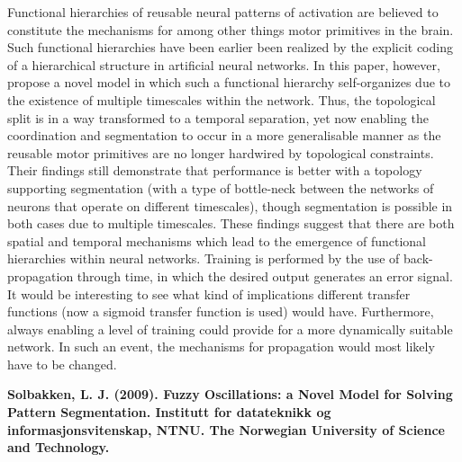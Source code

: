 Functional hierarchies of reusable neural patterns of activation are believed to constitute the mechanisms for among other things motor primitives in the brain. Such functional hierarchies have been earlier been realized by the explicit coding of a hierarchical structure in artificial neural networks. In this paper, however, \cite{Yamashita2008} propose a novel model in which such a functional hierarchy self-organizes due to the existence of multiple timescales within the network. Thus, the topological split is in a way transformed to a temporal separation, yet now enabling the coordination and segmentation to occur in a more generalisable manner as the reusable motor primitives are no longer hardwired by topological constraints. Their findings still demonstrate that performance is better with a topology supporting segmentation (with a type of bottle-neck between the networks of neurons that operate on different timescales), though segmentation is possible in both cases due to multiple timescales. These findings suggest that there are both spatial and temporal mechanisms which lead to the emergence of functional hierarchies within neural networks. Training is performed by the use of back-propagation through time, in which the desired output generates an error signal. It would be interesting to see what kind of implications different transfer functions (now a sigmoid transfer function is used) would have. Furthermore, always enabling a level of training could provide for a more dynamically suitable network. In such an event, the mechanisms for propagation would most likely have to be changed.


\textbf{Solbakken, L. J. (2009). Fuzzy Oscillations: a Novel Model for Solving Pattern Segmentation. Institutt for datateknikk og informasjonsvitenskap, NTNU. The Norwegian University of Science and Technology.}

